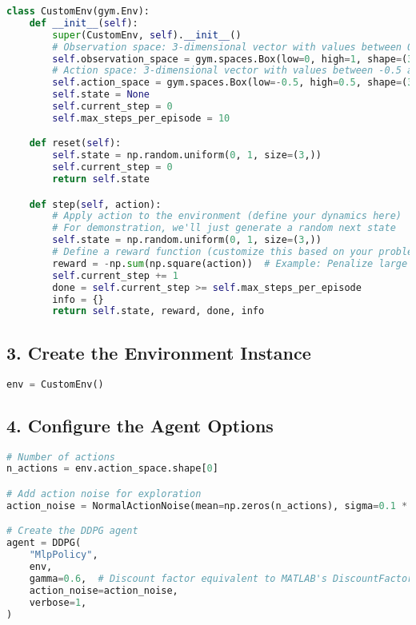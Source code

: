 \documentclass[12pt]{article}
\begin{document}
\begin{lstlisting}[language=Python, breaklines=true]
class CustomEnv(gym.Env):
    def __init__(self):
        super(CustomEnv, self).__init__()
        # Observation space: 3-dimensional vector with values between 0 and 1
        self.observation_space = gym.spaces.Box(low=0, high=1, shape=(3,), dtype=np.float32)
        # Action space: 3-dimensional vector with values between -0.5 and 0.5
        self.action_space = gym.spaces.Box(low=-0.5, high=0.5, shape=(3,), dtype=np.float32)
        self.state = None
        self.current_step = 0
        self.max_steps_per_episode = 10

    def reset(self):
        self.state = np.random.uniform(0, 1, size=(3,))
        self.current_step = 0
        return self.state

    def step(self, action):
        # Apply action to the environment (define your dynamics here)
        # For demonstration, we'll just generate a random next state
        self.state = np.random.uniform(0, 1, size=(3,))
        # Define a reward function (customize this based on your problem)
        reward = -np.sum(np.square(action))  # Example: Penalize large actions
        self.current_step += 1
        done = self.current_step >= self.max_steps_per_episode
        info = {}
        return self.state, reward, done, info
\end{lstlisting}

\subsection*{3. Create the Environment Instance}

\begin{lstlisting}[language=Python, breaklines=true]
env = CustomEnv()
\end{lstlisting}

\subsection*{4. Configure the Agent Options}

\begin{lstlisting}[language=Python, breaklines=true]
# Number of actions
n_actions = env.action_space.shape[0]

# Add action noise for exploration
action_noise = NormalActionNoise(mean=np.zeros(n_actions), sigma=0.1 * np.ones(n_actions))

# Create the DDPG agent
agent = DDPG(
    "MlpPolicy",
    env,
    gamma=0.6,  # Discount factor equivalent to MATLAB's DiscountFactor
    action_noise=action_noise,
    verbose=1,
)
\end{lstlisting}
\end{document}
